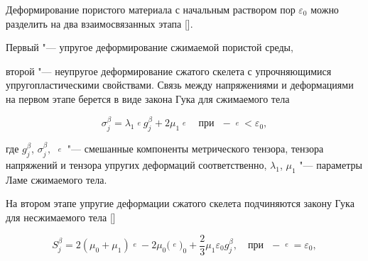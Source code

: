 \smallskip




Деформирование пористого материала с начальным раствором пор $\varepsilon _{0} $ можно разделить на два взаимосвязанных этапа []. 

Первый "--- упругое деформирование сжимаемой пористой среды, 

второй "--- неупругое деформирование сжатого скелета с упрочняющимися упругопластическими свойствами. Связь между напряжениями и деформациями на первом этапе берется в виде закона Гука для сжимаемого тела

\begin{equation} 

\label{eq:gotbuntov_1} 

\sigma _{j}^{\beta } = %

{\lambda _{1} \mathop{\varepsilon _{\alpha }^{\alpha } }\limits^{e} g_{j}^{\beta } +2\mu _{1} \mathop{\varepsilon _{j}^{\beta } }\limits^{e} } \quad \text{при~ }  -{\mathop{\varepsilon _{\alpha }^{\alpha } }\limits^{e} <\varepsilon _{0} ,} %

\end{equation} 

где $g_{j}^{\beta } $,  $\sigma _{j}^{\beta },$ $\mathop{\varepsilon _{j}^{\beta } }\limits^{e} $ "--- смешанные компоненты метрического тензора, тензора напряжений и тензора упругих деформаций соответственно, $\lambda _{1}$, $ \mu _{1} $ "--- параметры Ламе сжимаемого тела. 



На втором этапе упругие деформации сжатого скелета подчиняются закону Гука для несжимаемого тела []

\begin{equation} 

\label{eq:gotbuntov_2} 

S_{j}^{\beta } =


{2\left(\mu _{0} +\mu _{1} \right)\mathop{\varepsilon _{j}^{\beta } }\limits^{e} -2\mu _{0} 

\bigl(\mathop{\varepsilon _{j}^{\beta } }\limits^{e} \bigr)_{0} +\frac{2}{3} \mu _{1} \varepsilon _{0} g_{j}^{\beta } ,} \quad \text{при~ } -{\mathop{\varepsilon _{\alpha }^{\alpha } }\limits^{e} =\varepsilon _{0} ,} 


\end{equation} 

